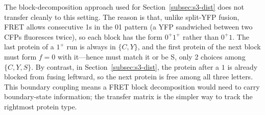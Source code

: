 \documentclass[11pt]{article}
\begin{document}
The block-decomposition approach used for Section~\ref{subsec:s3-dist} does not transfer cleanly to this setting. The reason is that, unlike split-YFP fusion, FRET allows consecutive 1s in the 01 pattern (a YFP sandwiched between two CFPs fluoresces twice), so each block has the form $0^+ 1^+$ rather than $0^+ 1$. The last protein of a $1^+$ run is always in $\{C, Y\}$, and the first protein of the next block must form $f = 0$ with it---hence must match it or be S, only 2 choices among $\{C, Y, S\}$. By contrast, in Section~\ref{subsec:s3-dist}, the protein after a $1$ is already blocked from fusing leftward, so the next protein is free among all three letters. This boundary coupling means a FRET block decomposition would need to carry boundary-state information; the transfer matrix is the simpler way to track the rightmost protein type.
\end{document}
